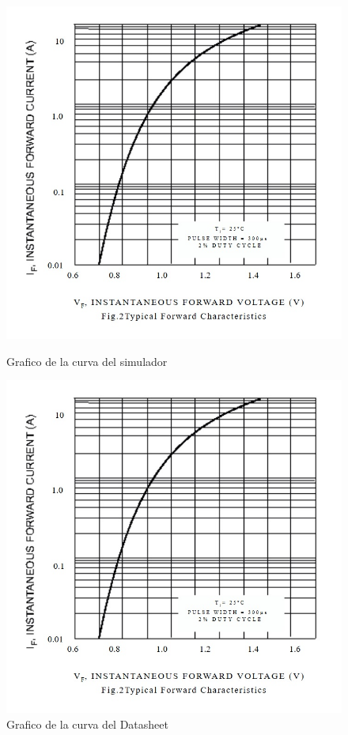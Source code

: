 \documentclass[chaptersright]{informeutn}
\begin{document}
          \begin{figure}[!h]
            \centering
            \begin{minipage}[b]{0.4\textwidth}
              \includegraphics[width=1.1\linewidth]{pictures/Curva_Datash_Si.jpg}
              \caption{Grafico de la curva del simulador}
            \end{minipage}
            \hfill
            \begin{minipage}[b]{0.4\textwidth}
              \includegraphics[width=1.1\linewidth]{pictures/Curva_Datash_Si.jpg}
              \caption{Grafico de la curva del Datasheet}
            \end{minipage}
          \end{figure}
\end{document}
